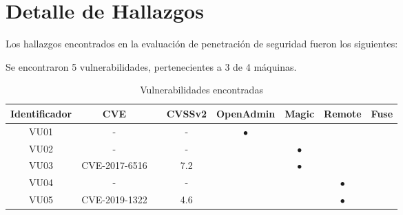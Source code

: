 \documentclass[a4paper]{article}
\begin{document}
\section{Detalle de Hallazgos}
\large{Los hallazgos encontrados en la evaluación de penetración de seguridad fueron los siguientes:}
\par
\vspace{0.1cm}
Se encontraron 5 vulnerabilidades, pertenecientes a 3 de 4 máquinas.
\par
\begin{table}[h]
    \centering
    \begin{tabular}{|c|c|m{2.9cm}|c|c|c|c|c|} \hline
        Identificador & CVE & \centering{Tipo de vulnerabilidad} & CVSSv2 & OpenAdmin & Magic & Remote & Fuse \\ \hline
        VU01 & - & \centering{Ejecución Remota de Código} & - & \Large{\begin{math}\bullet\end{math}} &  &  &  \\ \hline
        VU02 & - & \centering{Inyección SQL} & - &  & \Large{\begin{math}\bullet\end{math}} &  &  \\ \hline
        VU03 & CVE-2017-6516 & \centering{Obtención de privilegios} & 7.2 &  & \Large{\begin{math}\bullet\end{math}} &  &  \\ \hline
        VU04 & - & \centering{Ejecución Remota de Código} & - &  &  & \Large{\begin{math}\bullet\end{math}} &  \\ \hline
        VU05 & CVE-2019-1322 & \centering{Otros} & 4.6 &  &  & \Large{\begin{math}\bullet\end{math}} &  \\ \hline
    \end{tabular}
    \caption{Vulnerabilidades encontradas}
\end{table}
\end{document}
